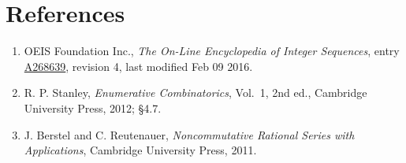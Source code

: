 \documentclass[11pt]{article}
\theoremstyle{definition}
\begin{document}
\section{References}

\begin{enumerate}

\item OEIS Foundation Inc., \emph{The On-Line Encyclopedia of Integer Sequences}, entry \href{https://oeis.org/A268639}{A268639}, revision 4, last modified Feb 09 2016.

\item R. P. Stanley, \emph{Enumerative Combinatorics}, Vol.~1, 2nd ed., Cambridge University Press, 2012; \S4.7.

\item J. Berstel and C. Reutenauer, \emph{Noncommutative Rational Series with Applications}, Cambridge University Press, 2011.

\end{enumerate}
\end{document}
